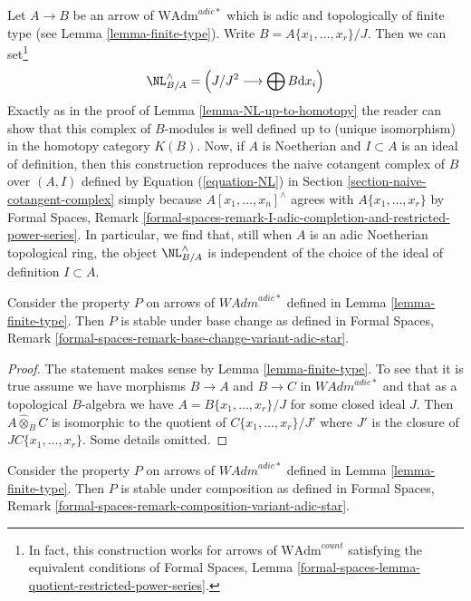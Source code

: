 \begin{remark}
\label{remark-NL-well-defined-topological}
Let $A \to B$ be an arrow of $\text{WAdm}^{adic*}$ which is adic and
topologically of finite type (see Lemma \ref{lemma-finite-type}). Write
$B = A\{x_1, \ldots, x_r\}/J$. Then we can set\footnote{In fact, this
construction works for arrows of $\text{WAdm}^{count}$ satisfying the
equivalent conditions of Formal Spaces, Lemma
\ref{formal-spaces-lemma-quotient-restricted-power-series}.}
$$
\NL_{B/A}^\wedge = \left(J/J^2 \longrightarrow \bigoplus B\text{d}x_i\right)
$$
Exactly as in the proof of Lemma \ref{lemma-NL-up-to-homotopy}
the reader can show that this complex of $B$-modules is
well defined up to (unique isomorphism) in the homotopy category $K(B)$.
Now, if $A$ is Noetherian and $I \subset A$ is an ideal of definition,
then this construction reproduces the naive cotangent complex
of $B$ over $(A, I)$ defined by Equation (\ref{equation-NL})
in Section \ref{section-naive-cotangent-complex} simply because
$A[x_1, \ldots, x_n]^\wedge$ agrees with $A\{x_1, \ldots, x_r\}$ by
Formal Spaces, Remark
\ref{formal-spaces-remark-I-adic-completion-and-restricted-power-series}.
In particular, we find that, still when $A$ is an adic Noetherian
topological ring, the object $\NL_{B/A}^\wedge$ is independent
of the choice of the ideal of definition $I \subset A$.
\end{remark}

\begin{lemma}
\label{lemma-base-change-finite-type}
Consider the property $P$ on arrows of $\textit{WAdm}^{adic*}$ defined in
Lemma \ref{lemma-finite-type}. Then $P$ is stable under base change as
defined in Formal Spaces, Remark
\ref{formal-spaces-remark-base-change-variant-adic-star}.
\end{lemma}

\begin{proof}
The statement makes sense by Lemma \ref{lemma-finite-type}.
To see that it is true assume we have morphisms
$B \to A$ and $B \to C$ in $\textit{WAdm}^{adic*}$
and that as a topological $B$-algebra we have
$A = B\{x_1, \ldots, x_r\}/J$ for some closed ideal $J$.
Then $A \widehat{\otimes}_B C$ is isomorphic to the
quotient of $C\{x_1, \ldots, x_r\}/J'$ where
$J'$ is the closure of $JC\{x_1, \ldots, x_r\}$.
Some details omitted.
\end{proof}

\begin{lemma}
\label{lemma-composition-finite-type}
Consider the property $P$ on arrows of $\textit{WAdm}^{adic*}$ defined in
Lemma \ref{lemma-finite-type}. Then $P$ is stable under composition as
defined in Formal Spaces, Remark
\ref{formal-spaces-remark-composition-variant-adic-star}.
\end{lemma}

